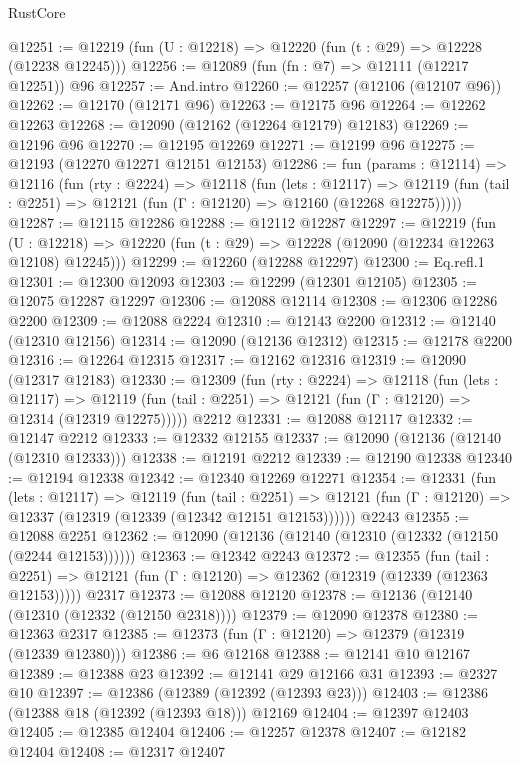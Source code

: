 \begin{lexlean}{RustCore}
\begin{coremodule}
@12251 := @12219 (fun (U : @12218) => @12220 (fun (t : @29) => @12228 (@12238 @12245)))
@12256 := @12089 (fun (fn : @7) => @12111 (@12217 @12251)) @96
@12257 := And.intro
@12260 := @12257 (@12106 (@12107 @96))
@12262 := @12170 (@12171 @96)
@12263 := @12175 @96
@12264 := @12262 @12263
@12268 := @12090 (@12162 (@12264 @12179) @12183)
@12269 := @12196 @96
@12270 := @12195 @12269
@12271 := @12199 @96
@12275 := @12193 (@12270 @12271 @12151 @12153)
@12286 := fun (params : @12114) =>
  @12116
    (fun (rty : @2224) =>
    @12118
      (fun (lets : @12117) =>
      @12119 (fun (tail : @2251) => @12121 (fun (Γ : @12120) => @12160 (@12268 @12275)))))
@12287 := @12115 @12286
@12288 := @12112 @12287
@12297 := @12219
    (fun (U : @12218) => @12220 (fun (t : @29) => @12228 (@12090 (@12234 @12263 @12108) @12245)))
@12299 := @12260 (@12288 @12297)
@12300 := Eq.refl.{1}
@12301 := @12300 @12093
@12303 := @12299 (@12301 @12105)
@12305 := @12075 @12287 @12297
@12306 := @12088 @12114
@12308 := @12306 @12286 @2200
@12309 := @12088 @2224
@12310 := @12143 @2200
@12312 := @12140 (@12310 @12156)
@12314 := @12090 (@12136 @12312)
@12315 := @12178 @2200
@12316 := @12264 @12315
@12317 := @12162 @12316
@12319 := @12090 (@12317 @12183)
@12330 := @12309
    (fun (rty : @2224) =>
    @12118
      (fun (lets : @12117) =>
      @12119 (fun (tail : @2251) => @12121 (fun (Γ : @12120) => @12314 (@12319 @12275)))))
    @2212
@12331 := @12088 @12117
@12332 := @12147 @2212
@12333 := @12332 @12155
@12337 := @12090 (@12136 (@12140 (@12310 @12333)))
@12338 := @12191 @2212
@12339 := @12190 @12338
@12340 := @12194 @12338
@12342 := @12340 @12269 @12271
@12354 := @12331
    (fun (lets : @12117) =>
    @12119
      (fun (tail : @2251) =>
      @12121 (fun (Γ : @12120) => @12337 (@12319 (@12339 (@12342 @12151 @12153))))))
    @2243
@12355 := @12088 @2251
@12362 := @12090 (@12136 (@12140 (@12310 (@12332 (@12150 (@2244 @12153))))))
@12363 := @12342 @2243
@12372 := @12355
    (fun (tail : @2251) => @12121 (fun (Γ : @12120) => @12362 (@12319 (@12339 (@12363 @12153)))))
    @2317
@12373 := @12088 @12120
@12378 := @12136 (@12140 (@12310 (@12332 (@12150 @2318))))
@12379 := @12090 @12378
@12380 := @12363 @2317
@12385 := @12373 (fun (Γ : @12120) => @12379 (@12319 (@12339 @12380)))
@12386 := @6 @12168
@12388 := @12141 @10 @12167
@12389 := @12388 @23
@12392 := @12141 @29 @12166 @31
@12393 := @2327 @10
@12397 := @12386 (@12389 (@12392 (@12393 @23)))
@12403 := @12386 (@12388 @18 (@12392 (@12393 @18))) @12169
@12404 := @12397 @12403
@12405 := @12385 @12404
@12406 := @12257 @12378
@12407 := @12182 @12404
@12408 := @12317 @12407

\end{coremodule}
\end{lexlean}
